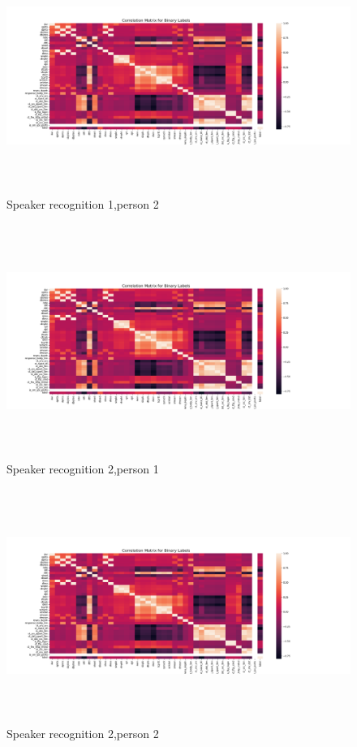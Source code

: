 \documentclass[12pt,a4paper]{report}
\begin{document}
\begin{figure} [hbtp]
\centering
\includegraphics[width=5in,height=3in]{pic/correlation_matrix_bin.png}
\caption{Speaker recognition 1,person 2}
\end{figure}

\begin{figure} [hbtp]
\centering
\includegraphics[width=5in,height=3in]{pic/correlation_matrix_bin.png}
\caption{Speaker recognition 2,person 1}
\end{figure}

\begin{figure} [hbtp]
\centering
\includegraphics[width=5in,height=3in]{pic/correlation_matrix_bin.png}
\caption{Speaker recognition 2,person 2}
\end{figure}
\end{document}

